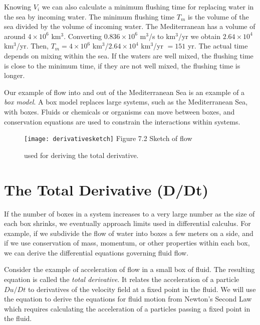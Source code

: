 Knowing $V_i$ we can also calculate a minimum flushing time for replacing water
in the sea by incoming water. The minimum flushing time $T_m$ is the volume of the
sea divided by the volume of incoming water. The Mediterranean has a volume of around $4 \times 10^6$ km$^3$. Converting $0.836 \times 10^6$ m$^3$/s to km$^3$/yr we obtain $2.64 \times10^4$ km$^3$/yr. Then, $T_m = 4 \times 10^6$ km$^3$/$2.64 \times 10^4$  km$^3$/yr $= 151$ yr. The actual time depends on mixing within the sea. If the waters are well mixed, the
flushing time is close to the minimum time, if they are not well mixed, the flushing time is
longer.

Our example of flow into and out of the Mediterranean Sea is an example of a \textit{box
model}. A box model replaces large systems, such as the Mediterranean Sea,
with boxes. Fluids or chemicals or organisms can move between boxes, and conservation equations are
used to constrain the interactions within systems.

\begin{figure}[b!]
\texttt{[image: derivativesketch]}
\centering
\footnotesize
Figure 7.2 Sketch of flow \rule{0mm}{4ex}used for deriving the
total derivative.

\label{fig:derivativesketch}
\vspace{-3ex}
\end{figure}

\section{The Total Derivative (D/Dt)}
If the number of boxes in a system increases to a very large number as the size of each box shrinks, we eventually approach limits used in differential calculus. For example, if we subdivide the flow of water into boxes a few meters on a side, and if we use conservation of mass, momentum, or other properties within each box, we can derive the differential equations governing fluid flow.

Consider the example of acceleration of flow in a small box of fluid. The
resulting equation is called the \textit{total derivative}. It relates the
acceleration of a particle $Du/Dt$ to derivatives of the velocity field at a
fixed point in the fluid. We will use the equation to derive the equations for
fluid motion from Newton's Second Law which  requires calculating the
acceleration of a particles passing a fixed point in the fluid.

